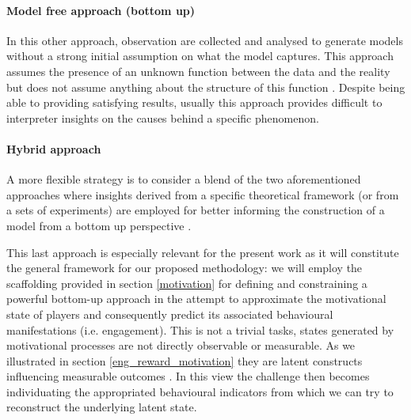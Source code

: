 \paragraph*{Model free approach (bottom up)} In this other approach, observation are collected and analysed to generate models without a strong initial assumption on what the model captures. This approach assumes the presence of an unknown function between the data and the reality but does not assume anything about the structure of this function \cite{yannakakis2013player}. Despite being able to providing satisfying results, usually this approach provides difficult to interpreter insights on the causes behind a specific phenomenon.

\paragraph*{Hybrid approach} A more flexible strategy is to consider a blend of the two aforementioned approaches where insights derived from a specific theoretical framework (or from a sets of experiments) are employed for better informing the construction of a model from a bottom up perspective \cite{yannakakis2013player}. 

This last approach is especially relevant for the present work as it will constitute the general framework for our proposed methodology: we will employ the scaffolding provided in section \ref{motivation} for defining and constraining a powerful bottom-up approach in the attempt to approximate the motivational state of players and consequently predict its associated behavioural manifestations (i.e. engagement). This is not a trivial tasks, states generated by motivational processes are not directly observable or measurable. As we illustrated in section \ref{eng_reward_motivation} they are latent constructs influencing measurable outcomes \cite{yannakakis2007game, bauckhage2012players}. In this view the challenge then becomes individuating the appropriated behavioural indicators from which we can try to reconstruct the underlying latent state. 


